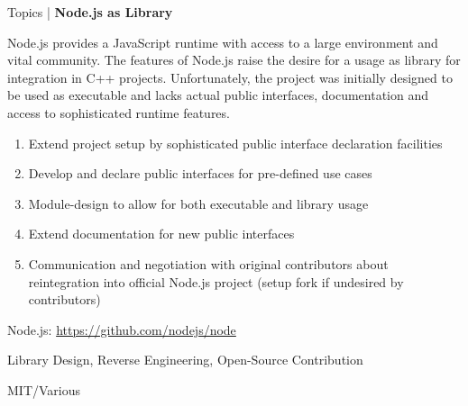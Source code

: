 \begin{frame}{Topics | \textbf{Node.js as Library}}
	
	\begin{description}[C++ Competencies]
		\item[Description] Node.js provides a JavaScript runtime with access to a large environment and vital community.
		The features of Node.js raise the desire for a usage as library for integration in C++ projects.
		Unfortunately, the project was initially designed to be used as executable and lacks actual public interfaces, documentation and access to sophisticated runtime features.
		\item[Goals]
			\begin{enumerate}
				\item Extend project setup by sophisticated public interface declaration facilities
				\item Develop and declare public interfaces for pre-defined use cases
				\item Module-design to allow for both executable and library usage
				\item Extend documentation for new public interfaces
				\item Communication and negotiation with original contributors about reintegration into official Node.js project (setup fork if undesired by contributors)
			\end{enumerate}
		\item[Starting Points] Node.js: \url{https://github.com/nodejs/node}
		\item[C++ Competencies] Library Design, Reverse Engineering, Open-Source Contribution
		\item[License] MIT/Various
	\end{description}
	
\end{frame}


